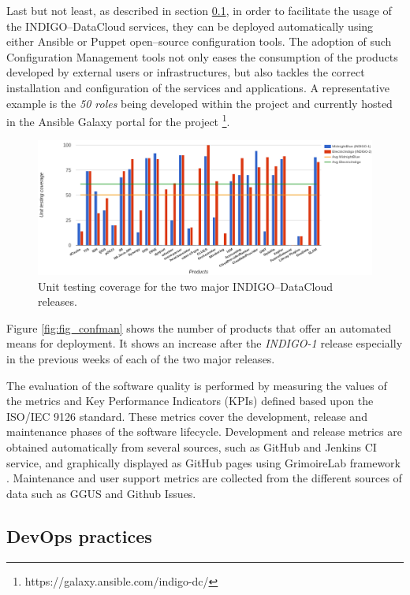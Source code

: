 \documentclass[journal]{IEEEtran}
\begin{document}
Last but not least, as described in section \ref{sec:devops}, in order
to facilitate the usage of the INDIGO--DataCloud services, they can be deployed
automatically using either Ansible \cite{indigo-ansible} or Puppet
\cite{indigo-puppet} open--source configuration tools. The adoption of such Configuration Management
tools not only eases the consumption of the products developed by external users or
infrastructures, but also tackles the correct installation and configuration of the
services and applications. A representative example is the \textit{50 roles} being 
developed within the project and currently hosted in the Ansible Galaxy portal for 
the project \footnote{https://galaxy.ansible.com/indigo-dc/}.

\begin{figure}[ht]
\centering
\includegraphics[width=\textwidth]{images/unittest.png}
\caption{Unit testing coverage for the two major INDIGO--DataCloud releases.}
\label{fig:fig_unittest}
\end{figure}

Figure \ref{fig:fig_confman} shows the number of products that offer an automated means
for deployment. It shows an increase after the {\sl INDIGO-1} release especially
in the previous weeks of each of the two major releases.

The evaluation of the software quality is performed by measuring the values of
the metrics and Key Performance Indicators (KPIs) defined based upon the
ISO/IEC 9126 standard. These metrics cover the development, release and
maintenance phases of the software lifecycle. Development and release metrics
are obtained automatically from several sources, such as GitHub and Jenkins CI
service, and graphically displayed as GitHub pages using GrimoireLab framework
\cite{grimoirelab}. Maintenance and user support metrics are collected from the
different sources of data such as GGUS \cite{ggus} and Github Issues.

\subsection{DevOps practices}
\label{sec:devops}
\end{document}
